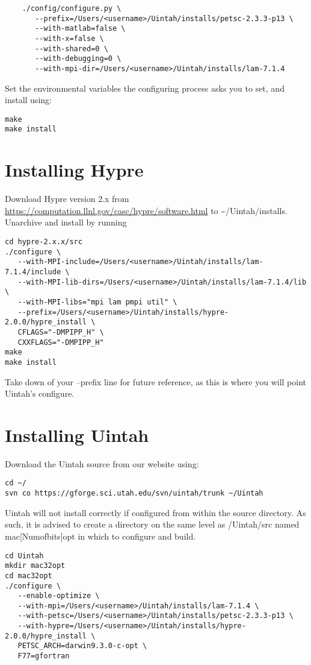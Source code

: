 \documentclass[11pt,fleqn]{book} %
\begin{document}
\begin{lstlisting}
	./config/configure.py \
	   --prefix=/Users/<username>/Uintah/installs/petsc-2.3.3-p13 \
	   --with-matlab=false \
	   --with-x=false \
	   --with-shared=0 \
	   --with-debugging=0 \
	   --with-mpi-dir=/Users/<username>/Uintah/installs/lam-7.1.4
\end{lstlisting}

Set the environmental variables the configuring process asks you to
set, and install using:

\begin{lstlisting}
make
make install
\end{lstlisting}

\section{Installing Hypre}
Download Hypre version 2.x from
\url{https://computation.llnl.gov/casc/hypre/software.html} to
\textasciitilde/Uintah/installs.  Unarchive and install by running

\begin{lstlisting}
cd hypre-2.x.x/src
./configure \
   --with-MPI-include=/Users/<username>/Uintah/installs/lam-7.1.4/include \
   --with-MPI-lib-dirs=/Users/<username>/Uintah/installs/lam-7.1.4/lib \
   --with-MPI-libs="mpi lam pmpi util" \
   --prefix=/Users/<username>/Uintah/installs/hypre-2.0.0/hypre_install \
   CFLAGS="-DMPIPP_H" \
   CXXFLAGS="-DMPIPP_H" 
make
make install
\end{lstlisting}

Take down of your --prefix line for future reference, as this is where
you will point Uintah's configure.

\section{Installing Uintah}
Download the Uintah source from our website using:

\begin{lstlisting}
cd ~/
svn co https://gforge.sci.utah.edu/svn/uintah/trunk ~/Uintah
\end{lstlisting}

Uintah will not install correctly if configured from within the source
directory.  As such, it is advised to create a directory on the same
level as /Uintah/src named mac[Numofbits]opt in which to configure and
build.

\begin{lstlisting}
cd Uintah
mkdir mac32opt
cd mac32opt
./configure \
   --enable-optimize \
   --with-mpi=/Users/<username>/Uintah/installs/lam-7.1.4 \
   --with-petsc=/Users/<username>/Uintah/installs/petsc-2.3.3-p13 \
   --with-hypre=/Users/<username>/Uintah/installs/hypre-2.0.0/hypre_install \
   PETSC_ARCH=darwin9.3.0-c-opt \
   F77=gfortran
\end{lstlisting}
\end{document}
